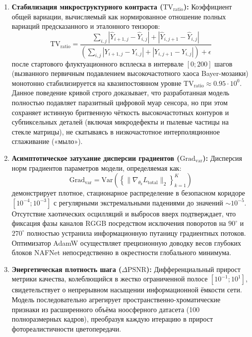 \documentclass[12pt,a4paper]{article}
\begin{document}
\begin{enumerate}
    \item \textbf{Стабилизация микроструктурного контраста ($\text{TV}_{\text{ratio}}$):} Коэффициент общей вариации, вычисляемый как нормированное отношение полных вариаций предсказанного и эталонного тензоров:
    \begin{equation}
    \text{TV}_{\text{ratio}} = \frac{\sum_{i,j} |\hat{Y}_{i+1,j} - \hat{Y}_{i,j}| + |\hat{Y}_{i,j+1} - \hat{Y}_{i,j}|}{\left(\sum_{i,j} |Y_{i+1,j} - Y_{i,j}| + |Y_{i,j+1} - Y_{i,j}|\right) + \epsilon}
    \end{equation}
    после стартового флуктуационного всплеска в интервале $[0; 200]$ шагов (вызванного первичным подавлением высокочастотного хаоса Bayer-мозаики) монотонно стабилизируется на квазипостоянном уровне $\text{TV}_{\text{ratio}} \approx 0.95 \cdot 10^0$. Данное поведение кривой строго доказывает, что разработанная модель полностью подавляет паразитный цифровой муар сенсора, но при этом сохраняет истинную бритвенную чёткость высокочастотных контуров и субпиксельных деталей (включая микродефекты и пылевые частицы на стекле матрицы), не скатываясь в низкочастотное интерполяционное сглаживание («мыло»).
    
    \item \textbf{Асимптотическое затухание дисперсии градиентов ($\text{Grad}_{\text{var}}$):} Дисперсия норм градиентов параметров модели, определяемая как:
    \begin{equation}
    \text{Grad}_{\text{var}} = \text{Var}\left( \left\{ \|\nabla_{\theta_k} L_{\text{total}}\|_2 \right\}_{k=1}^{K} \right)
    \end{equation}
    демонстрирует плотное, стационарное распределение в безопасном коридоре $[10^{-4}; 10^{-3}]$ с регулярными экстремальными падениями до значений $\sim 10^{-5}$. Отсутствие хаотических осцилляций и выбросов вверх подтверждает, что фиксация фазы каналов RGGB посредством исключения поворотов на $90^\circ$ и $270^\circ$ полностью устранила информационную путаницу градиентных потоков. Оптимизатор AdamW осуществляет прецизионную доводку весов глубоких блоков NAFNet непосредственно в окрестности глобального минимума.
    
    \item \textbf{Энергетическая плотность шага ($\Delta\text{PSNR}$):} Дифференциальный прирост метрики качества, колеблющийся в жестко ограниченной полосе $[10^{-1}; 10^1]$, свидетельствует о непрерывном насыщении информационной ёмкости сети. Модель последовательно агрегирует пространственно-хроматические признаки из расширенного объёма ноосферного датасета (100 полноразмерных кадров), преобразуя каждую итерацию в прирост фотореалистичности цветопередачи.
\end{enumerate}
\end{document}
